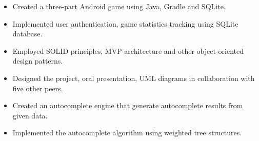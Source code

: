 
\vspace{5pt}

\begin{itemize}
	\item Created a three-part Android game using Java, Gradle and SQLite.
    \item Implemented user authentication, game statistics tracking using SQLite database.
    \item Employed SOLID principles, MVP architecture and other object-oriented design patterns.
	\item Designed the project, oral presentation, UML diagrams in collaboration with five other peers.
\end{itemize}

\divider


\vspace{5pt}

\begin{itemize}
	\item Created an autocomplete engine that generate autocomplete results from given data.
	\item Implemented the autocomplete algorithm using weighted tree structures.
\end{itemize}


